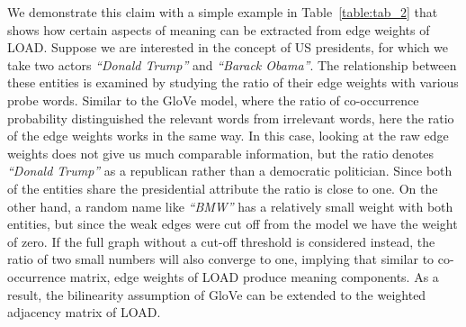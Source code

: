 We demonstrate this claim with a simple example in Table~\ref{table:tab_2} that shows how certain aspects of meaning can be extracted from edge weights of LOAD. Suppose we are interested in the concept of US presidents, for which we take two actors \emph{``Donald Trump''} and \emph{``Barack Obama''}. The relationship between these entities is examined by studying the ratio of their edge weights with various probe words. Similar to the GloVe model, where the ratio of co-occurrence probability distinguished the relevant words from irrelevant words, here the ratio of the edge weights works in the same way. In this case, looking at the raw edge weights does not give us much comparable information, but the ratio denotes \emph{``Donald Trump''} as a republican rather than a democratic politician. Since both of the entities share the presidential attribute the ratio is close to one. On the other hand, a random name like \emph{``BMW''} has a relatively small weight with both entities, but since the weak edges were cut off from the model we have the weight of zero. If  the full graph without a cut-off threshold is considered instead, the ratio of two small numbers will also converge to one, implying that similar to co-occurrence matrix, edge weights of LOAD produce meaning components. As a result, the bilinearity assumption of GloVe can be extended to the weighted adjacency matrix of LOAD. 


